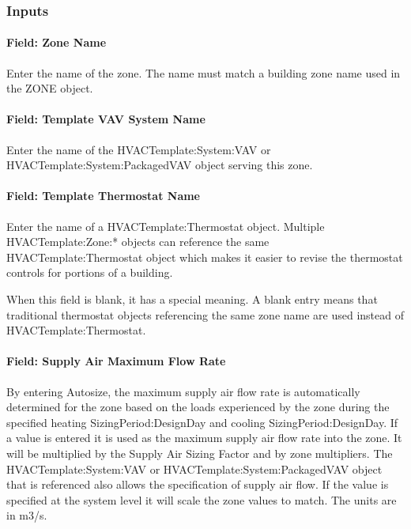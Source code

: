 \subsubsection{Inputs}\label{inputs-9-008}

\paragraph{Field: Zone Name}\label{field-zone-name-8-001}

Enter the name of the zone. The name must match a building zone name used in the ZONE object.

\paragraph{Field: Template VAV System Name}\label{field-template-vav-system-name}

Enter the name of the HVACTemplate:System:VAV or HVACTemplate:System:PackagedVAV object serving this zone.

\paragraph{Field: Template Thermostat Name}\label{field-template-thermostat-name-8}

Enter the name of a HVACTemplate:Thermostat object. Multiple HVACTemplate:Zone:* objects can reference the same HVACTemplate:Thermostat object which makes it easier to revise the thermostat controls for portions of a building.

When this field is blank, it has a special meaning. A blank entry means that traditional thermostat objects referencing the same zone name are used instead of HVACTemplate:Thermostat.

\paragraph{Field: Supply Air Maximum Flow Rate}\label{field-supply-air-maximum-flow-rate-2}

By entering Autosize, the maximum supply air flow rate is automatically determined for the zone based on the loads experienced by the zone during the specified heating SizingPeriod:DesignDay and cooling SizingPeriod:DesignDay. If a value is entered it is used as the maximum supply air flow rate into the zone. It will be multiplied by the Supply Air Sizing Factor and by zone multipliers. The HVACTemplate:System:VAV or HVACTemplate:System:PackagedVAV object that is referenced also allows the specification of supply air flow. If the value is specified at the system level it will scale the zone values to match. The units are in m3/s.

